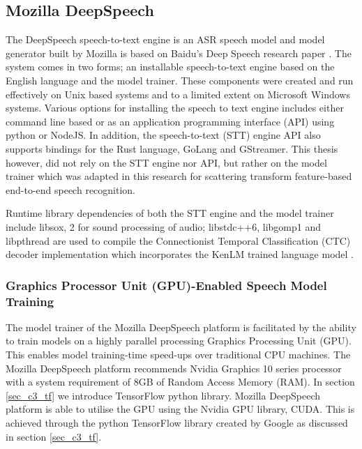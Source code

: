 \subsection{Mozilla DeepSpeech}\label{sec_c3_moz}
The DeepSpeech speech-to-text engine is an ASR speech model and model generator built by Mozilla is based on Baidu's Deep Speech research paper \citep{hannun2014deep}.  The system comes in two forms;  an installable speech-to-text engine based on the English language and the model trainer. These components were created and run effectively on Unix based systems and to a limited extent on Microsoft Windows systems.  Various options for installing the speech to text engine includes either command line based or as an application programming interface (API) using python or NodeJS.  In addition, the speech-to-text (STT) engine API also supports bindings for the Rust language, GoLang and GStreamer.  This thesis however, did not rely on the STT engine nor API, but rather on the model trainer which was adapted in this research for scattering transform feature-based end-to-end speech recognition.

Runtime library dependencies of both the STT engine and the model trainer include libsox, 2 for sound processing of audio; libstdc++6, libgomp1 and libpthread are used to compile the Connectionist Temporal Classification (CTC) decoder implementation which incorporates the KenLM trained language model \citep{Heafield-estimate}.
\subsubsection{Graphics Processor Unit (GPU)-Enabled Speech Model Training}
The model trainer of the Mozilla DeepSpeech platform is facilitated by the ability to train models on a highly parallel processing Graphics Processing Unit (GPU).  This enables model training-time speed-ups over traditional CPU machines.  The Mozilla DeepSpeech platform recommends Nvidia Graphics 10 series processor with a system requirement of 8GB of Random Access Memory (RAM). In section \ref{sec_c3_tf} we introduce TensorFlow python library.  Mozilla DeepSpeech platform is able to utilise the GPU using the Nvidia GPU library, CUDA.  This is achieved through the python TensorFlow library created by Google as discussed in section \ref{sec_c3_tf}.
